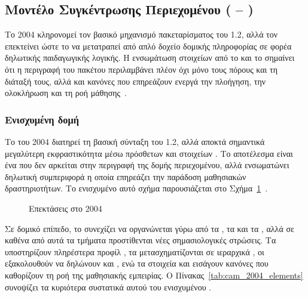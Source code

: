 \subsection{Μοντέλο Συγκέντρωσης Περιεχομένου ( -- )}
\label{subsec:scorm2004_cam}

Το  2004  κληρονομεί τον βασικό μηχανισμό πακεταρίσματος του  1.2, αλλά τον επεκτείνει ώστε το  να μετατραπεί από απλό δοχείο δομικής πληροφορίας σε φορέα δηλωτικής παιδαγωγικής λογικής. Η ενσωμάτωση στοιχείων από το  και το  σημαίνει ότι η περιγραφή του πακέτου περιλαμβάνει πλέον όχι μόνο τους πόρους και τη διάταξή τους, αλλά και κανόνες που επηρεάζουν ενεργά την πλοήγηση, την ολοκλήρωση και τη ροή μάθησης~\cite{ADL_SCORM2004_CAM, IMS_CP_Specification, ADL_SCORM2004_SN, SCORM_CAM_Extensions}.

\subsubsection{Ενισχυμένη δομή }

Το \texttt{} του  2004 διατηρεί τη βασική σύνταξη του  1.2, αλλά αποκτά σημαντικά μεγαλύτερη εκφραστικότητα μέσω πρόσθετων  και στοιχείων . Το αποτέλεσμα είναι ένα  που δεν αρκείται στην περιγραφή της δομής περιεχομένου, αλλά ενσωματώνει δηλωτική συμπεριφορά η οποία επηρεάζει την παράδοση μαθησιακών δραστηριοτήτων. Το ενισχυμένο αυτό σχήμα παρουσιάζεται στο Σχήμα~\ref{fig:cam_2004_extensions}~\cite{ADL_SCORM2004_CAM, IMS_SS_InfoModel}.

\begin{figure}[htbp]
\centering

\caption{Επεκτάσεις  στο  2004 }
\label{fig:cam_2004_extensions}
\end{figure}

Σε δομικό επίπεδο, το  συνεχίζει να οργανώνεται γύρω από τα , τα  και τα , αλλά σε καθένα από αυτά τα τμήματα προστίθενται νέες σημασιολογικές στρώσεις. Τα  υποστηρίζουν πληρέστερα προφίλ , τα  μετασχηματίζονται σε ιεραρχικά , οι  εξακολουθούν να δηλώνουν  και , ενώ τα στοιχεία  και  εισάγουν κανόνες που καθορίζουν τη ροή της μαθησιακής εμπειρίας. Ο Πίνακας~\ref{tab:cam_2004_elements} συνοψίζει τα κυριότερα συστατικά αυτού του ενισχυμένου .

